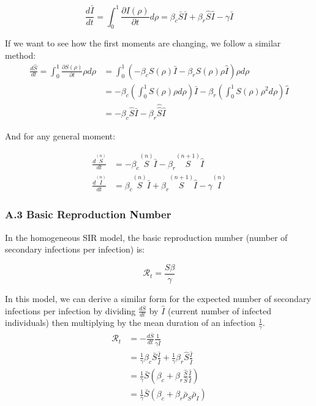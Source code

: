 \[\frac{d \bar{I}}{dt} = \int_{0}^{1} \frac{\partial I(\rho)}{\partial t} d\rho
= \beta_c \bar S \bar I + \beta_r \hat S \hat I - \gamma \bar I\]

If we want to see how the first moments are changing, we follow a
similar method: \[
\begin{aligned}
\frac{d \hat{S}}{dt} = \int_{0}^{1} \frac{\partial S(\rho)}{\partial t} \rho d\rho
&= \int_{0}^{1} (-\beta_c S(\rho) \bar I - \beta_r S(\rho) \rho \hat I) \rho d\rho  \\
&= -\beta_c (\int_{0}^{1} S(\rho) \rho d\rho) \bar I
    - \beta_r (\int_{0}^{1} S(\rho) \rho^2 d\rho) \hat I\\
&= -\beta_c \hat S \bar I - \beta_r \hat{\hat{ S}} \hat I
\end{aligned}
\]

And for any general moment:

\[
\begin{aligned}
\frac{d \overset{(n)}{S} }{dt} &=
    -\beta_c \overset{(n)}{S} \bar I
    -\beta_r \overset{(n+1)}{S} \hat I \\
\frac{d \overset{(n)}{I}}{dt} &=
    \beta_c \overset{(n)}{S} \bar I
    + \beta_r \overset{(n+1)}{S} \hat I - \gamma \overset{(n)}{I}
\end{aligned}
\]

\subsubsection{A.3 Basic Reproduction
Number}\label{a.3-basic-reproduction-number}

In the homogeneous SIR model, the basic reproduction number (number of
secondary infections per infection) is:

\[\mathcal{R}_t = \frac{S\beta}{\gamma}\]

In this model, we can derive a similar form for the expected number of
secondary infections per infection by dividing \(\frac{d \bar S}{dt}\)
by \(\hat I\) (current number of infected individuals) then multiplying
by the mean duration of an infection \(\frac{1}{\gamma}\). \[
\begin{aligned}
\mathcal{R}_t &= -\frac{d\bar S}{dt} \frac{1}{\gamma \bar I} \\
    &= \frac{1}{\gamma} \beta_c \bar S \frac{\bar I}{\bar I}
        + \frac{1}{\gamma} \beta_r \hat S \frac{\hat I}{\bar I}\\
    &= \frac{1}{\gamma} \bar S\left( \beta_c
        + \beta_r \frac{\hat S}{\bar S} \frac{\hat I}{\bar I} \right)\\
    &= \frac{1}{\gamma} \bar S\left( \beta_c
        + \beta_r \bar \rho_S \bar \rho_I \right)\\
\end{aligned}
\]

